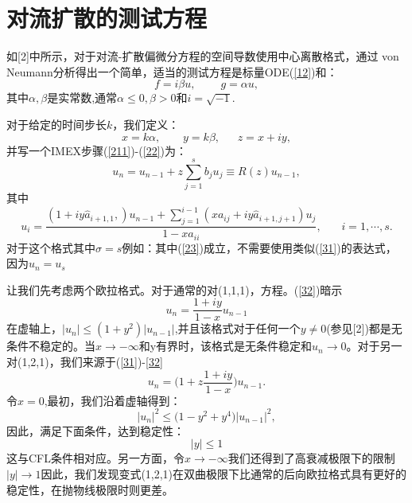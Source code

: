 \documentclass[12pt,a4paper]{article}
\begin{document}
\section{对流扩散的测试方程}

如[2]中所示，对于对流-扩散偏微分方程的空间导数使用中心离散格式，通过 von Neumann分析得出一个简单，适当的测试方程是标量ODE(\ref{12})和：
\begin{equation*}
f=i\beta u,~~~~~~~~~~g=\alpha u,
\end{equation*}
其中$\alpha,\beta$是实常数,通常$\alpha\le 0,\beta>0$和$i=\sqrt{-1}$.

对于给定的时间步长$k$，我们定义：
\begin{equation*}
x=k\alpha,~~~~~~~~~y=k\beta,~~~~~~~z=x+iy,
\end{equation*}
并写一个IMEX步骤(\ref{211})-(\ref{22})为：
\begin{equation}
u_{n}=u_{n-1}+z\sum_{j=1}^{s}b_{j}u_{j}\equiv R(z)u_{n-1},
\label{31}
\end{equation}
其中
\begin{equation}
u_{i}=\frac{(1+iy\widehat{a}_{i+1,1},)u_{n-1}+\sum_{j=1}^{i-1}(xa_{ij}+iy\widehat{a}_{i+1,j+1})u_{j}}{1-xa_{ii}},~~~~~~~~i=1,\cdots,s.
\label{32}
\end{equation}
对于这个格式其中$\sigma=s$例如：其中(\ref{23})成立，不需要使用类似(\ref{31})的表达式，因为$u_{n}=u_{s}$

让我们先考虑两个欧拉格式。对于通常的对(1,1,1)，方程。(\ref{32})暗示
\begin{equation*}
u_{n}=\frac{1+iy}{1-x} u_{n-1}
\end{equation*}
在虚轴上，$|u_{n}|\le (1+y^2)|u_{n-1}|$,并且该格式对于任何一个$y\ne 0$(参见[2])都是无条件不稳定的。当$x\to -\infty$和y有界时，该格式是无条件稳定和$u_{n}\to 0$。对于另一对(1,2,1)，我们来源于(\ref{31})-\ref{32}
\begin{equation*}
u_{n}=\bigg(1+z\frac{1+iy}{1-x}\biggl)u_{n-1}.
\end{equation*}
令$x=0$,最初，我们沿着虚轴得到：
\begin{equation*}
|u_{n}|^2\le \bigg(1-y^2+y^4\biggl)|u_{n-1}|^2,
\end{equation*}
因此，满足下面条件，达到稳定性：
\begin{equation*}
|y|\le 1
\end{equation*}
这与CFL条件相对应。另一方面，令$x\to -\infty$我们还得到了高衰减极限下的限制$|y|\to 1$因此，我们发现变式(1,2,1)在双曲极限下比通常的后向欧拉格式具有更好的稳定性，在抛物线极限时则更差。
\end{document}
